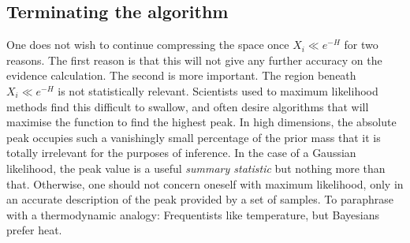 \subsection{Terminating the algorithm}
One does not wish to continue compressing the space once \(X_i\ll e^{-H}\) for two reasons. The first reason is that this will not give any further accuracy on the evidence calculation. The second is more important. The region beneath \(X_i\ll e^{-H}\) is not statistically relevant. Scientists used to maximum likelihood methods find this difficult to swallow, and often desire algorithms that will maximise the function to find the highest peak. In high dimensions, the absolute peak occupies such a vanishingly small percentage of the prior mass that it is totally irrelevant for the purposes of inference. In the case of a Gaussian likelihood, the peak value is a useful {\em summary statistic\/} but nothing more than that. Otherwise, one should not concern oneself with maximum likelihood, only in an accurate description of the peak provided by a set of samples. To paraphrase with a thermodynamic analogy: Frequentists like temperature, but Bayesians prefer heat.

